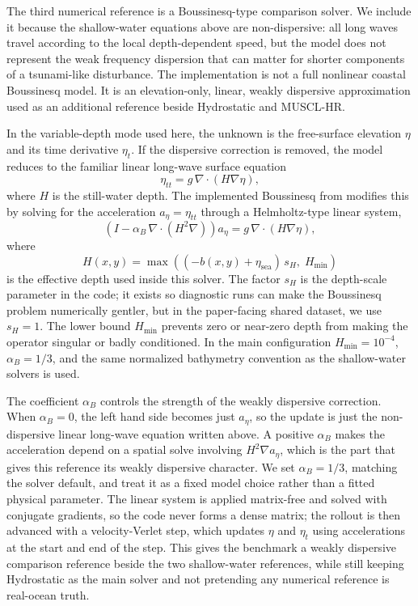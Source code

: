 The third numerical reference is a Boussinesq-type comparison solver. We include it because the shallow-water equations above are non-dispersive: all long waves travel according to the local depth-dependent speed, but the model does not represent the weak frequency dispersion that can matter for shorter components of a tsunami-like disturbance. The implementation is not a full nonlinear coastal Boussinesq model. It is an elevation-only, linear, weakly dispersive approximation used as an additional reference beside Hydrostatic and MUSCL-HR.

In the variable-depth mode used here, the unknown is the free-surface elevation $\eta$ and its time derivative $\eta_t$. If the dispersive correction is removed, the model reduces to the familiar linear long-wave surface equation
\[
\eta_{tt} = g\, \nabla \cdot(H \nabla \eta),
\]
where $H$ is the still-water depth. The implemented Boussinesq from modifies this by solving for the acceleration $a_\eta = \eta_{tt}$ through a Helmholtz-type linear system,
\[
\left(I - \alpha_B\, \nabla \cdot(H ^ 2 \nabla)\right) a_\eta = g\, \nabla \cdot(H \nabla \eta),
\]
where
\[
H(x, y) = \max\!\left((-b(x, y) + \eta_{\mathrm{sea}})\, s_H,\; H_{\min}\right)
\]
is the effective depth used inside this solver. The factor $s_H$ is the depth-scale parameter in the code; it exists so diagnostic runs can make the Boussinesq problem numerically gentler, but in the paper-facing shared dataset, we use $s_H = 1$. The lower bound $H_{\min}$ prevents zero or near-zero depth from making the operator singular or badly conditioned. In the main configuration $H_{\min} = 10^{-4}$, $\alpha_B = 1/3$, and the same normalized bathymetry convention as the shallow-water solvers is used.

The coefficient $\alpha_B$ controls the strength of the weakly dispersive correction. When $\alpha_B = 0$, the left hand side becomes just $a_\eta$, so the update is just the non-dispersive linear long-wave equation written above. A positive $\alpha_B$ makes the acceleration depend on a spatial solve involving $H ^ 2 \nabla a_\eta$, which is the part that gives this reference its weakly dispersive character. We set $\alpha_B = 1/3$, matching the solver default, and treat it as a fixed model choice rather than a fitted physical parameter. The linear system is applied matrix-free and solved with conjugate gradients, so the code never forms a dense matrix; the rollout is then advanced with a velocity-Verlet step, which updates $\eta$ and $\eta_t$ using accelerations at the start and end of the step. This gives the benchmark a weakly dispersive comparison reference beside the two shallow-water references, while still keeping Hydrostatic as the main solver and not pretending any numerical reference is real-ocean truth.

